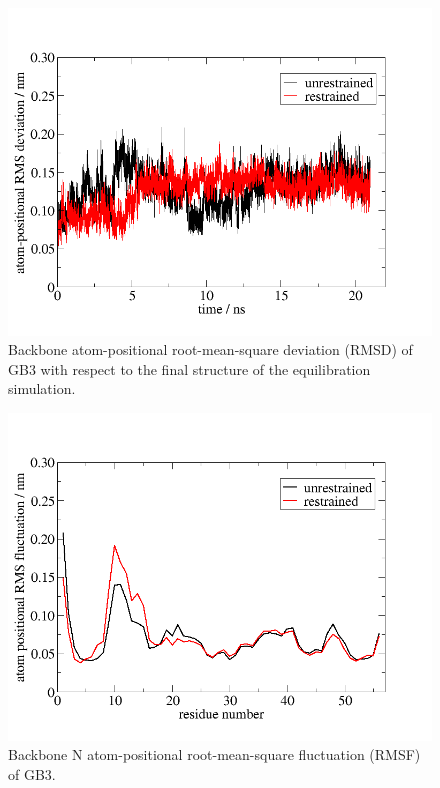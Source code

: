 \begin{figure}[H]
\centering
\includegraphics[scale=.3]{../04_tutorial_01/figures/GB3_RMSD}
\caption{Backbone atom-positional root-mean-square deviation (RMSD) of GB3 with respect to the final structure of the equilibration simulation.}
\label{GB3_rmsd}
\end{figure}

\begin{figure}[H]
\centering
\includegraphics[scale=.3]{../04_tutorial_01/figures/GB3_RMSF}
\caption{Backbone N atom-positional root-mean-square fluctuation (RMSF) of GB3.}
\label{GB3_rmsf}
\end{figure}

